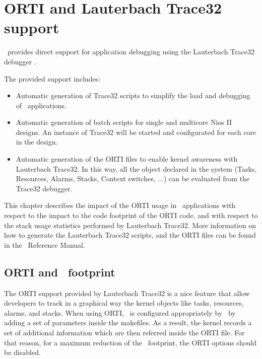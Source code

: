 %
%
\chapter{ORTI and Lauterbach Trace32 support}
\label{sec:orti_t32}

\ee\ provides direct support for application debugging using the
Lauterbach Trace32 debugger \cite{Lauterbach}.

The provided support includes:
\begin{itemize}
\item Automatic generation of Trace32 scripts to simplify the load and
  debugging of \ee\ applications.
\item Automatic generation of batch scripts for single and multicore
  Nios II designs. An instance of Trace32 will be started and
  configurated for each core in the design.
\item Automatic generation of the ORTI files to enable kernel
  awareness with Lauterbach Trace32. In this way, all the object
  declared in the system (Tasks, Resources, Alarms, Stacks, Context
  switches, ...) can be evaluated from the Trace32 debugger.
\end{itemize}

This chapter describes the impact of the ORTI usage in \ee\
applications with respect to the impact to the code footprint of the
ORTI code, and with respect to the stack usage statistics performed by
Lauterbach Trace32. More information on how to generate the Lauterbach
Trace32 scripts, and the ORTI files can be found in the \rtd\
Reference Manual.


\section{ORTI and \ee\ footprint}
The ORTI support provided by Lauterbach Trace32 is a nice feature that
allow developers to track in a graphical way the kernel objects like
tasks, resources, alarms, and stacks. When using ORTI, \ee\ is
configured appropriately by \rtd\ by adding a set of parameters inside
the makefiles. As a result, the kernel records a set of additional
information which are then referred inside the ORTI file. For that
reason, for a maximum reduction of the \ee\ footprint, the ORTI options
should be disabled.

